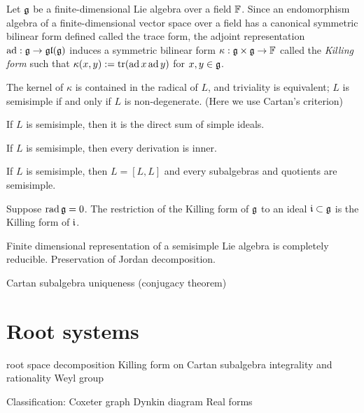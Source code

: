 \documentclass{../../large}
\begin{document}
\begin{prb}
Let $\mathfrak{g}$ be a finite-dimensional Lie algebra over a field $\mathbb{F}$.
Since an endomorphism algebra of a finite-dimensional vector space over a field has a canonical symmetric bilinear form defined called the trace form, the adjoint representation $\operatorname{ad}:\mathfrak{g}\to\mathfrak{gl}(\mathfrak{g})$ induces a symmetric bilinear form $\kappa:\mathfrak{g}\times\mathfrak{g}\to\mathbb{F}$ called the \emph{Killing form} such that $\kappa(x,y):=\operatorname{tr}(\operatorname{ad} x\operatorname{ad} y)$ for $x,y\in\mathfrak{g}$.
\begin{parts}
\item The kernel of $\kappa$ is contained in the radical of $L$, and triviality is equivalent; $L$ is semisimple if and only if $L$ is non-degenerate. (Here we use Cartan's criterion)
\item If $L$ is semisimple, then it is the direct sum of simple ideals.
\item If $L$ is semisimple, then every derivation is inner.
\item If $L$ is semisimple, then $L=[L,L]$ and every subalgebras and quotients are semisimple.
\end{parts}
\end{prb}
\begin{pf}

Suppose $\operatorname{rad}\mathfrak{g}=0$.
The restriction of the Killing form of $\mathfrak{g}$ to an ideal $\mathfrak{i}\subset\mathfrak{g}$ is the Killing form of $\mathfrak{i}$.

\end{pf}


\begin{prb}
Finite dimensional representation of a semisimple Lie algebra is completely reducible.
Preservation of Jordan decomposition.
\end{prb}

\begin{prb}
Cartan subalgebra uniqueness (conjugacy theorem)
\end{prb}




\chapter{Root systems}
root space decomposition
Killing form on Cartan subalgebra
integrality and rationality
Weyl group


Classification:
Coxeter graph
Dynkin diagram
Real forms
\end{document}
